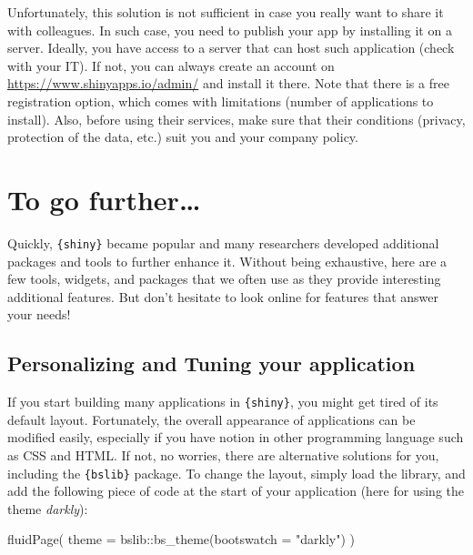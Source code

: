 \documentclass[
]{book}
\newenvironment{Shaded}{\begin{snugshade}}{\end{snugshade}}
\newcommand{\AttributeTok}[1]{\textcolor[rgb]{0.77,0.63,0.00}{#1}}
\newcommand{\FunctionTok}[1]{\textcolor[rgb]{0.00,0.00,0.00}{#1}}
\newcommand{\NormalTok}[1]{#1}
\newcommand{\SpecialCharTok}[1]{\textcolor[rgb]{0.00,0.00,0.00}{#1}}
\newcommand{\StringTok}[1]{\textcolor[rgb]{0.31,0.60,0.02}{#1}}
\begin{document}
Unfortunately, this solution is not sufficient in case you really want to share it with colleagues. In such case, you need to publish your app by installing it on a server. Ideally, you have access to a server that can host such application (check with your IT). If not, you can always create an account on \url{https://www.shinyapps.io/admin/} and install it there. Note that there is a free registration option, which comes with limitations (number of applications to install). Also, before using their services, make sure that their conditions (privacy, protection of the data, etc.) suit you and your company policy.

\hypertarget{to-go-further-3}{%
\section{To go further\ldots{}}\label{to-go-further-3}}

Quickly, \texttt{\{shiny\}} became popular and many researchers developed additional packages and tools to further enhance it. Without being exhaustive, here are a few tools, widgets, and packages that we often use as they provide interesting additional features. But don't hesitate to look online for features that answer your needs!

\hypertarget{personalizing-and-tuning-your-application}{%
\subsection{Personalizing and Tuning your application}\label{personalizing-and-tuning-your-application}}

If you start building many applications in \texttt{\{shiny\}}, you might get tired of its default layout. Fortunately, the overall appearance of applications can be modified easily, especially if you have notion in other programming language such as CSS and HTML. If not, no worries, there are alternative solutions for you, including the \texttt{\{bslib\}} package.
To change the layout, simply load the library, and add the following piece of code at the start of your application (here for using the theme \emph{darkly}):

\begin{Shaded}
\begin{Highlighting}[]
\FunctionTok{fluidPage}\NormalTok{(}
  \AttributeTok{theme =}\NormalTok{ bslib}\SpecialCharTok{::}\FunctionTok{bs\_theme}\NormalTok{(}\AttributeTok{bootswatch =} \StringTok{"darkly"}\NormalTok{)}
\NormalTok{)}
\end{Highlighting}
\end{Shaded}
\end{document}
